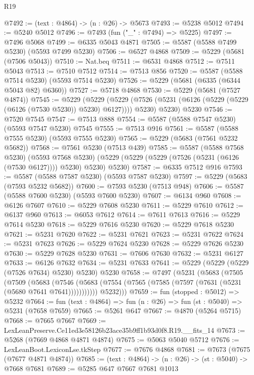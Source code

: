 \begin{lexlean}{R19}
\begin{coremodule}
@7492 := (text : @4864) -> (n : @26) -> @5673
@7493 := @5238 @5012
@7494 := @5240 @5012
@7496 := @7493 (fun ("_" : @7494) => @5225)
@7497 := @7496 @5068
@7499 := @6335 @5043 @4871
@7505 := @5587 (@5588 @7499 @5230) (@5593 @7499 @5230)
@7506 := @6527 @4868
@7509 := @5229 (@5681 (@7506 @5043))
@7510 := Nat.beq
@7511 := @6531 @4868
@7512 := @7511 @5043
@7513 := @7510 @7512
@7514 := @7513 @856
@7520 := @5587 (@5588 @7514 @5230) (@5593 @7514 @5230)
@7526 := @5229 (@5681 (@6335 (@6344 @5043 @82) @6360))
@7527 := @5718 @4868
@7530 := @5229 (@5681 (@7527 @4874))
@7545 := @5229
    (@5229
      (@5229 (@7526 (@5231 (@6126 (@5229 (@5229 (@6126 (@7530 @5230)) @5230) @6127)))) @5230)
      @5230)
    @5230
@7546 := @7520 @7545
@7547 := @7513 @888
@7554 := @5587 (@5588 @7547 @5230) (@5593 @7547 @5230) @7545
@7555 := @7513 @916
@7561 := @5587 (@5588 @7555 @5230) (@5593 @7555 @5230)
@7565 := @5229 (@5683 (@7561 @5232 @5682))
@7568 := @7561 @5230 (@7513 @439)
@7585 := @5587
    (@5588 @7568 @5230)
    (@5593 @7568 @5230)
    (@5229 (@5229 (@5229 (@7526 (@5231 (@6126 (@7530 @6127)))) @5230) @5230) @5230)
@7587 := @6335 @7512 @916
@7593 := @5587 (@5588 @7587 @5230) (@5593 @7587 @5230)
@7597 := @5229 (@5683 (@7593 @5232 @5682))
@7600 := @7593 @5230 (@7513 @948)
@7606 := @5587 (@5588 @7600 @5230) (@5593 @7600 @5230)
@7607 := @6134 @960
@7608 := @6126 @7607
@7610 := @5229 @7608 @5230
@7611 := @5229 @7610
@7612 := @6137 @960
@7613 := @6053 @7612
@7614 := @7611 @7613
@7616 := @5229 @7614 @5230
@7618 := @5229 @7616 @5230
@7620 := @5229 @7618 @5230
@7621 := @5231 @7620
@7622 := @5231 @7621
@7623 := @5231 @7622
@7624 := @5231 @7623
@7626 := @5229 @7624 @5230
@7628 := @5229 @7626 @5230
@7630 := @5229 @7628 @5230
@7631 := @7606 @7630
@7632 := @5231 @6127
@7633 := @6126 @7632
@7634 := @5231 @7633
@7641 := @5229 (@5229 (@5229 (@7526 @7634) @5230) @5230) @5230
@7658 := @7497
    (@5231
      (@5683
        (@7505
          (@7509
            (@5683
              (@7546 (@5683 (@7554 (@7565 (@7585 (@7597 (@7631 (@5231 (@5680 @7641 @7641)))))))))))
          @5232)))
@7659 := fun (stopped : @5012) => @5232
@7664 := fun (text : @4864) => fun (n : @26) => fun (st : @5040) => @5231 (@7658 @7659)
@7665 := @5261 @647
@7667 := @4870 (@5264 @5715)
@7668 := @7665 @7667
@7669 := LexLeanPreserve.Ce11ed3e58126b23ace35b9ff1b93d0f8.R19.__fits_14
@7673 := @5268 (@7669 @4868 @4871 @4874)
@7675 := @5063 @5040 @5712
@7676 := LexLeanBoot.LexiconLse.tkStep
@7677 := @7676 @4868
@7681 := @7673 (@7675 (@7677 @4871 @4874))
@7685 := (text : @4864) -> (n : @26) -> (st : @5040) -> @7668 @7681
@7689 := @5285 @647 @7667 @7681 @1013

\end{coremodule}
\end{lexlean}
